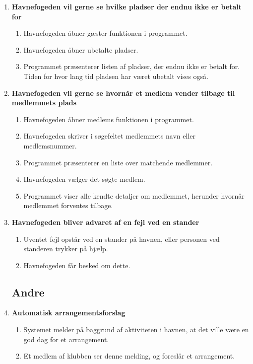 \begin{enumerate}
    \item{\bf{Havnefogeden vil gerne se hvilke pladser der endnu ikke er betalt for}}
      \begin{enumerate}
        \item Havnefogeden åbner gæster funktionen i programmet.
        \item Havnefogeden åbner ubetalte pladser.
        \item Programmet præsenterer listen af pladser, der endnu ikke er betalt for. Tiden for hvor lang tid pladsen har været ubetalt vises også.
      \end{enumerate}

    \item{\bf{Havnefogeden vil gerne se hvornår et medlem vender tilbage til medlemmets plads}}
      \begin{enumerate}
        \item Havnefogeden åbner medlems funktionen i programmet.
        \item Havnefogeden skriver i søgefeltet medlemmets navn eller medlemsnummer.
        \item Programmet præsenterer en liste over matchende medlemmer.
        \item Havnefogeden vælger det søgte medlem.
        \item Programmet viser alle kendte detaljer om medlemmet, herunder hvornår medlemmet forventes tilbage.
      \end{enumerate}

    \item{\bf{Havnefogeden bliver advaret af en fejl ved en stander}}
      \begin{enumerate}
        \item Uventet fejl opstår ved en stander på havnen, eller personen ved standeren trykker på hjælp.
        \item Havnefogeden får besked om dette.
      \end{enumerate}

\subsection{Andre}

    \item{\bf{Automatisk arrangementsforslag}}
      \begin{enumerate}
        \item Systemet melder på baggrund af aktiviteten i havnen, at det ville være en god dag for et arrangement.
        \item Et medlem af klubben ser denne melding, og foreslår et arrangement.
      \end{enumerate}


\end{enumerate}
